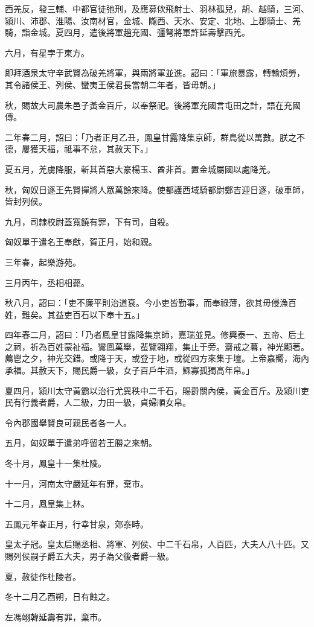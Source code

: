 \begin{pinyinscope}
西羌反，發三輔、中都官徒弛刑，及應募佽飛射士、羽林孤兒，胡、越騎，三河、潁川、沛郡、淮陽、汝南材官，金城、隴西、天水、安定、北地、上郡騎士、羌騎，詣金城。夏四月，遣後將軍趙充國、彊弩將軍許延壽擊西羌。

六月，有星孛于東方。

即拜酒泉太守辛武賢為破羌將軍，與兩將軍並進。詔曰：「軍旅暴露，轉輸煩勞，其令諸侯王、列侯、蠻夷王侯君長當朝二年者，皆毋朝。」

秋，賜故大司農朱邑子黃金百斤，以奉祭祀。後將軍充國言屯田之計，語在充國傳。

二年春二月，詔曰：「乃者正月乙丑，鳳皇甘露降集京師，群鳥從以萬數。朕之不德，屢獲天福，祗事不怠，其赦天下。」

夏五月，羌虜降服，斬其首惡大豪楊玉、酋非首。置金城屬國以處降羌。

秋，匈奴日逐王先賢撣將人眾萬餘來降。使都護西域騎都尉鄭吉迎日逐，破車師，皆封列侯。

九月，司隸校尉蓋寬饒有罪，下有司，自殺。

匈奴單于遣名王奉獻，賀正月，始和親。

三年春，起樂游苑。

三月丙午，丞相相薨。

秋八月，詔曰：「吏不廉平則治道衰。今小吏皆勤事，而奉祿薄，欲其毋侵漁百姓，難矣。其益吏百石以下奉十五。」

四年春二月，詔曰：「乃者鳳皇甘露降集京師，嘉瑞並見。修興泰一、五帝、后土之祠，祈為百姓蒙祉福。鸞鳳萬舉，蜚覽翱翔，集止于旁。齋戒之暮，神光顯著。薦鬯之夕，神光交錯。或降于天，或登于地，或從四方來集于壇。上帝嘉嚮，海內承福。其赦天下，賜民爵一級，女子百戶牛酒，鰥寡孤獨高年帛。」

夏四月，潁川太守黃霸以治行尤異秩中二千石，賜爵關內侯，黃金百斤。及潁川吏民有行義者爵，人二級，力田一級，貞婦順女帛。

令內郡國舉賢良可親民者各一人。

五月，匈奴單于遣弟呼留若王勝之來朝。

冬十月，鳳皇十一集杜陵。

十一月，河南太守嚴延年有罪，棄巿。

十二月，鳳皇集上林。

五鳳元年春正月，行幸甘泉，郊泰畤。

皇太子冠。皇太后賜丞相、將軍、列侯、中二千石帛，人百匹，大夫人八十匹。又賜列侯嗣子爵五大夫，男子為父後者爵一級。

夏，赦徒作杜陵者。

冬十二月乙酉朔，日有蝕之。

左馮翊韓延壽有罪，棄巿。


\end{pinyinscope}
